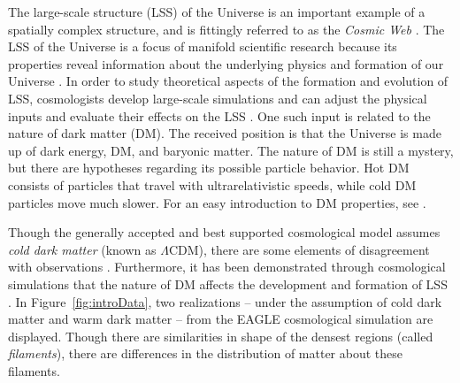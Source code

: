 \documentclass[12pt]{article}
\newcommand{\figref}[1]{Figure~\ref{#1}}
\begin{document}
The large-scale structure (LSS) of the Universe is an important example of a spatially complex structure, and is fittingly referred to as the \emph{Cosmic Web} \citep{bond1996filaments,springel2006large}. The LSS of the Universe is a focus of manifold scientific research because its properties reveal information about the underlying physics and formation of our Universe \citep{davis1985evolution}. In order to study theoretical aspects of the formation and evolution of LSS, cosmologists develop large-scale simulations and can adjust the physical inputs and evaluate their effects on the LSS \citep{cooray2002halo,centrella1983three,doroshkevich1980two,schaye2015eagle}. One such input is related to the nature of dark matter (DM). The received position is that the Universe is made up of dark energy, DM, and baryonic matter. The nature of DM is still a mystery, but there are hypotheses regarding its possible particle behavior. Hot DM consists of particles that travel with ultrarelativistic speeds, while cold DM particles move much slower. For an easy introduction to DM properties, see \cite[p. 61-63]{HilbeEtAl2014}.

Though the generally accepted and best supported cosmological model assumes \emph{cold dark matter} (known as $\Lambda$CDM), there are some elements of disagreement with observations \citep{SchneiderEtAl2012}. Furthermore, it has been demonstrated through cosmological simulations that the nature of DM affects the development and formation of LSS \citep{SchneiderEtAl2012}.  In \figref{fig:introData}, two realizations -- under the assumption of cold dark matter and warm dark matter -- from the EAGLE cosmological simulation \citep{schaye2015eagle} are displayed. Though there are similarities in shape of the densest regions (called \emph{filaments}), there are differences in the distribution of matter about these filaments.
\end{document}
